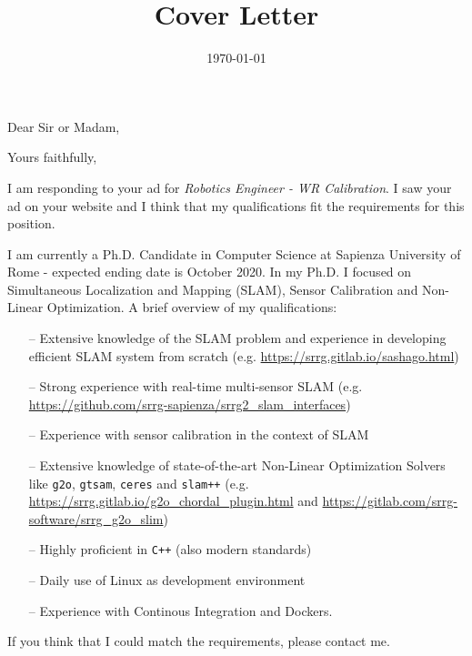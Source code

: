 \documentclass[11pt,a4paper,roman]{moderncv}
\title{Cover Letter}                               %
\begin{document}
\date{\today}
\opening{Dear Sir or Madam,}
\closing{Yours faithfully,}
\makelettertitle

I am responding to your ad for \emph{Robotics Engineer - WR Calibration}.
I saw your ad on your website and I think that my qualifications
fit the requirements for this position.

I am currently a Ph.D. Candidate in Computer Science at Sapienza University of Rome -
expected ending date is October 2020.
In my Ph.D. I focused on Simultaneous Localization and Mapping (SLAM), Sensor Calibration and
Non-Linear Optimization. A brief overview of my qualifications:

\vspace{10pt}
\begin{itemize}
\item[--] Extensive knowledge of the SLAM problem and
  experience in developing efficient SLAM system from scratch
  (e.g. \url{https://srrg.gitlab.io/sashago.html})
\item[--] Strong experience with real-time multi-sensor SLAM (e.g. \url{https://github.com/srrg-sapienza/srrg2_slam_interfaces})
\item[--] Experience with sensor calibration in the context of SLAM
\item[--] Extensive knowledge of state-of-the-art Non-Linear Optimization Solvers like \texttt{g2o}, \texttt{gtsam}, \texttt{ceres} and \texttt{slam++}
  (e.g. \url{https://srrg.gitlab.io/g2o_chordal_plugin.html} and
  \url{https://gitlab.com/srrg-software/srrg_g2o_slim})
\item[--] Highly proficient in \texttt{C++} (also modern standards)
\item[--] Daily use of Linux as development environment
\item[--] Experience with Continous Integration and Dockers.
\end{itemize}
\vspace{10pt}

If you think that I could match the requirements, please contact me.

\makeletterclosing
\end{document}
